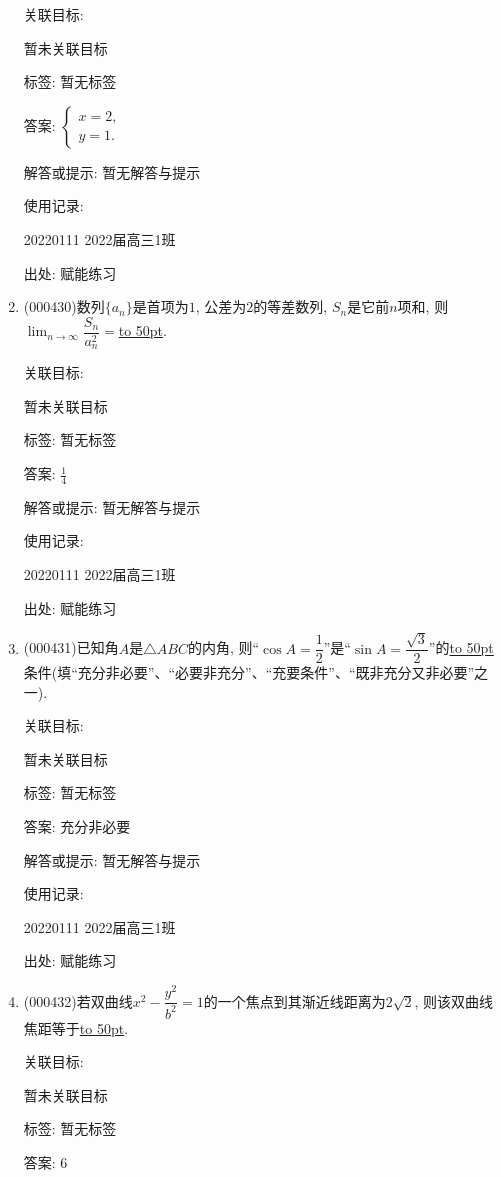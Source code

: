 \documentclass[10pt,a4paper]{article}
\newcommand{\blank}[1]{\underline{\hbox to #1pt{}}}
\begin{document}
\begin{enumerate}[1.]
关联目标:

暂未关联目标



标签: 暂无标签

答案: $\begin{cases} x=2, \\ y=1. \end{cases}$

解答或提示: 暂无解答与提示

使用记录:

20220111	2022届高三1班	


出处: 赋能练习
\item { (000430)}数列$\{a_n\}$是首项为$1$, 公差为$2$的等差数列, $S_n$是它前$n$项和, 则$\displaystyle\lim_{n\to\infty}\dfrac{S_n}{a_n^2}=$\blank{50}.


关联目标:

暂未关联目标



标签: 暂无标签

答案: $\frac 14$

解答或提示: 暂无解答与提示

使用记录:

20220111	2022届高三1班	


出处: 赋能练习
\item { (000431)}已知角$A$是$\triangle ABC$的内角, 则``$\cos A=\dfrac12$''是``$\sin A=\dfrac{\sqrt3}2$''的\blank{50}条件(填``充分非必要''、``必要非充分''、``充要条件''、``既非充分又非必要''之一).


关联目标:

暂未关联目标



标签: 暂无标签

答案: 充分非必要

解答或提示: 暂无解答与提示

使用记录:

20220111	2022届高三1班	


出处: 赋能练习
\item { (000432)}若双曲线$x^2-\dfrac{y^2}{b^2}=1$的一个焦点到其渐近线距离为$2\sqrt2$, 则该双曲线焦距等于\blank{50}.


关联目标:

暂未关联目标



标签: 暂无标签

答案: $6$


\end{enumerate}
\end{document}
